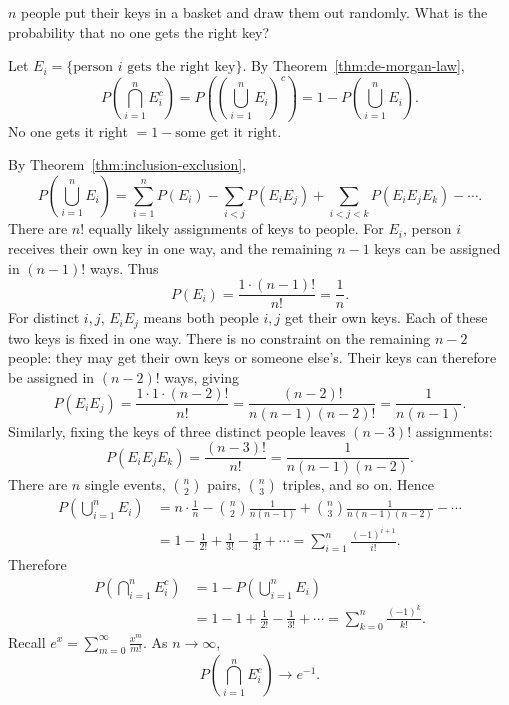 \begin{example}
  $n$ people put their keys in a basket and draw them out randomly.
  What is the probability that no one gets the right key?

  Let $E_i=\{\text{person }i\text{ gets the right key}\}$.
  By Theorem~\ref{thm:de-morgan-law},
  \[
    P\left(\bigcap_{i=1}^n E_i^c\right)
    =P\left(\left(\bigcup_{i=1}^n E_i\right)^c\right)
    =1-P\left(\bigcup_{i=1}^n E_i\right).
  \]
  No one gets it right $=1-\text{some get it right}$.

  By Theorem~\ref{thm:inclusion-exclusion},
  \[
    P\left(\bigcup_{i=1}^n E_i\right)
    =\sum_{i=1}^n P(E_i)-\sum_{i<j}P(E_iE_j)
    +\sum_{i<j<k}P(E_iE_jE_k)-\cdots.
  \]
  There are $n!$ equally likely assignments of keys to people.
  For $E_i$, person $i$ receives their own key in one way, and the remaining
  $n-1$ keys can be assigned in $(n-1)!$ ways. Thus
  \[
    P(E_i)=\frac{1\cdot(n-1)!}{n!}=\frac1n.
  \]
  For distinct $i,j$, $E_iE_j$ means both people $i,j$ get their own keys.
  Each of these two keys is fixed in one way. There is no constraint on the
  remaining $n-2$ people: they may get their own keys or someone else's.
  Their keys can therefore be assigned in $(n-2)!$ ways, giving
  \[
    P(E_iE_j)=\frac{1\cdot1\cdot(n-2)!}{n!}
    =\frac{(n-2)!}{n(n-1)(n-2)!}
    =\frac{1}{n(n-1)}.
  \]
  Similarly, fixing the keys of three distinct people leaves $(n-3)!$ assignments:
  \[
    P(E_iE_jE_k)=\frac{(n-3)!}{n!}
    =\frac{1}{n(n-1)(n-2)}.
  \]
  There are $n$ single events, $\binom n2$ pairs, $\binom n3$ triples, and so on.
  Hence
  \begin{align*}
    P\left(\bigcup_{i=1}^n E_i\right)
     & =n\cdot\frac1n-\binom n2\frac{1}{n(n-1)}
    +\binom n3\frac{1}{n(n-1)(n-2)}-\cdots        \\
     & =1-\frac1{2!}+\frac1{3!}-\frac1{4!}+\cdots
    =\sum_{i=1}^n\frac{(-1)^{i+1}}{i!}.
  \end{align*}
  Therefore
  \begin{align*}
    P\left(\bigcap_{i=1}^n E_i^c\right)
     & =1-P\left(\bigcup_{i=1}^n E_i\right) \\
     & =1-1+\frac1{2!}-\frac1{3!}+\cdots
    =\sum_{k=0}^n\frac{(-1)^k}{k!}.
  \end{align*}
  Recall $e^x=\sum_{m=0}^{\infty}\frac{x^m}{m!}$. As $n\to\infty$,
  \[
    P\left(\bigcap_{i=1}^n E_i^c\right)\longrightarrow e^{-1}.
  \]

\end{example}

